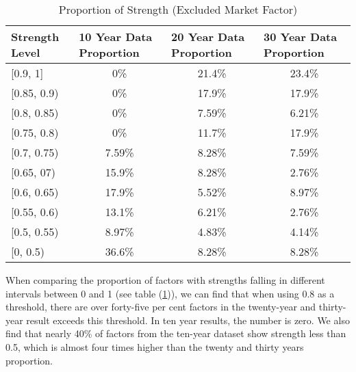 \begin{table}[hbt!]
	\centering
	\caption{Proportion of Strength (Excluded Market Factor) }\label{table:proportion}
	\begin{tabular}{lccc}
		\hline
		\hline
		Strength Level & \multicolumn{1}{l}{10 Year Data Proportion} & \multicolumn{1}{l}{20 Year Data Proportion} & \multicolumn{1}{l}{30 Year Data Proportion} \\ \hline
		{[}0.9, 1{]}   & 0\%                                         & 21.4\%                                      & 23.4\%                                         \\
		{[}0.85, 0.9)  & 0\%                                         & 17.9\%                                      & 17.9\%                                      \\
		{[}0.8, 0.85)  & 0\%                                         & 7.59\%                                      & 6.21\%                                      \\
		{[}0.75, 0.8)  & 0\%                                         & 11.7\%                                      & 17.9\%                                      \\
		{[}0.7, 0.75)  & 7.59\%                                      & 8.28\%                                      & 7.59\%                                      \\
		{[}0.65, 07)   & 15.9\%                                      & 8.28\%                                      & 2.76\%                                      \\
		{[}0.6, 0.65)  & 17.9\%                                      & 5.52\%                                      & 8.97\%                                      \\
		{[}0.55, 0.6)  & 13.1\%                                      & 6.21\%                                      & 2.76\%                                      \\
		{[}0.5, 0.55)  & 8.97\%                                      & 4.83\%                                      & 4.14\%                                      \\
		{[}0, 0.5)     & 36.6\%                                      & 8.28\%                                      & 8.28\%                                      \\ \hline\hline
	\end{tabular}
\end{table}

When comparing the proportion of factors with strengths falling in different intervals between 0 and 1 (see table (\ref{table:proportion})), we can find that when using 0.8 as a threshold, there are over forty-five per cent factors in the twenty-year and thirty-year result exceeds this threshold.
In ten year results, the number is zero.
We also find that nearly 40\% of factors from the ten-year dataset show strength less than 0.5, which is almost four times higher than the twenty and thirty years proportion.

